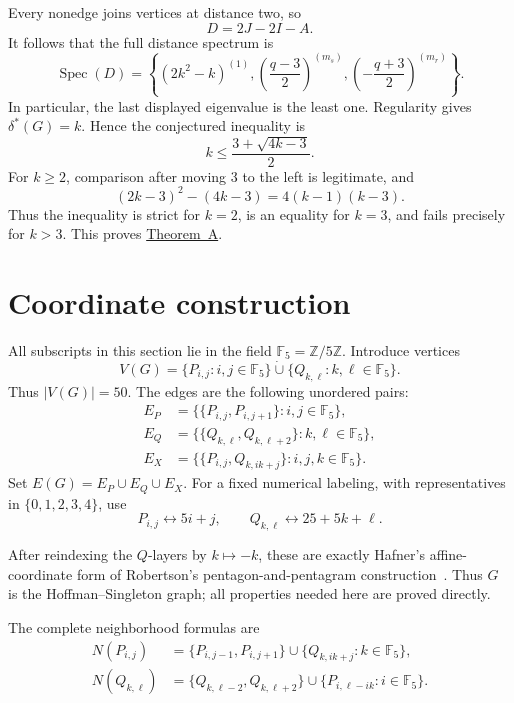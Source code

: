 \documentclass[a4paper,11pt,reqno]{amsart}
\theoremstyle{plain}
\theoremstyle{definition}
\theoremstyle{remark}
\newcommand{\F}{\mathbb F_5}
\newcommand{\Spec}{\operatorname{Spec}}
\begin{document}
Every nonedge joins vertices at distance two, so
\begin{equation}\label{eq:general-distance}
 D=2J-2I-A.
\end{equation}
It follows that the full distance spectrum is
\begin{equation}\label{eq:general-distance-spectrum}
 \Spec(D)=
 \left\{(2k^2-k)^{(1)},
 \left(\frac{q-3}{2}\right)^{(m_s)},
 \left(-\frac{q+3}{2}\right)^{(m_r)}\right\}.
\end{equation}
In particular, the last displayed eigenvalue is the least one.  Regularity
gives \(\delta^*(G)=k\).  Hence the conjectured inequality is
\[
 k\le\frac{3+\sqrt{4k-3}}2.
\]
For \(k\ge2\), comparison after moving 3 to the left is legitimate, and
\[
 (2k-3)^2-(4k-3)=4(k-1)(k-3).
\]
Thus the inequality is strict for \(k=2\), is an equality for \(k=3\), and
fails precisely for \(k>3\).  This proves
\hyperref[thm:moore-wow]{Theorem~A}.

\section{Coordinate construction}

All subscripts in this section lie in the field
\(\F=\mathbb Z/5\mathbb Z\).  Introduce vertices
\[
 V(G)=\{P_{i,j}:i,j\in\F\}\mathbin{\dot\cup}
      \{Q_{k,\ell}:k,\ell\in\F\}.
\]
Thus \(|V(G)|=50\).  The edges are the following unordered pairs:
\begin{align*}
 E_P&=\bigl\{\{P_{i,j},P_{i,j+1}\}:i,j\in\F\bigr\},\\
 E_Q&=\bigl\{\{Q_{k,\ell},Q_{k,\ell+2}\}:k,\ell\in\F\bigr\},\\
 E_X&=\bigl\{\{P_{i,j},Q_{k,ik+j}\}:i,j,k\in\F\bigr\}.
\end{align*}
Set \(E(G)=E_P\cup E_Q\cup E_X\).  For a fixed numerical labeling, with
representatives in \(\{0,1,2,3,4\}\), use
\[
 P_{i,j}\longleftrightarrow 5i+j,
 \qquad
 Q_{k,\ell}\longleftrightarrow 25+5k+\ell.
\]

After reindexing the \(Q\)-layers by \(k\mapsto-k\), these are exactly
Hafner's affine-coordinate form of Robertson's pentagon-and-pentagram
construction~\cite[Section~2 and Theorem~2.1]{Hafner2003}.  Thus \(G\) is the
Hoffman--Singleton graph; all properties needed here are proved directly.

The complete neighborhood formulas are
\begin{align}
 N(P_{i,j})
 &=\{P_{i,j-1},P_{i,j+1}\}
   \cup\{Q_{k,ik+j}:k\in\F\},\label{eq:p-neighborhood}\\
 N(Q_{k,\ell})
 &=\{Q_{k,\ell-2},Q_{k,\ell+2}\}
   \cup\{P_{i,\ell-ik}:i\in\F\}.
   \label{eq:q-neighborhood}
\end{align}
\end{document}
